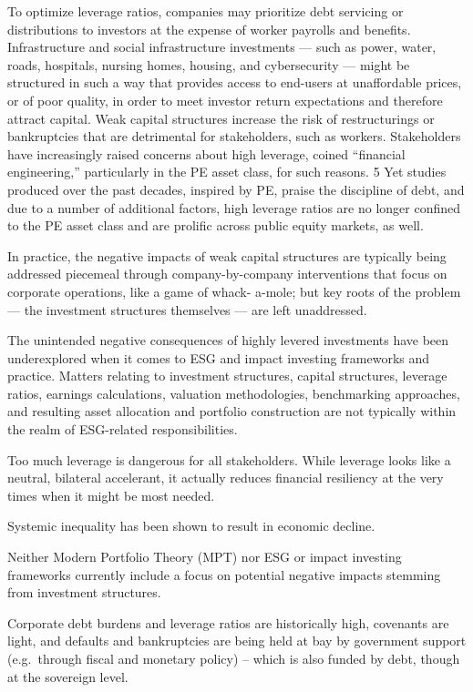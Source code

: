 \documentclass[
]{book}
\begin{document}
To optimize leverage ratios, companies may prioritize debt servicing or distributions to investors at the
expense of worker payrolls and benefits. Infrastructure and social infrastructure investments --- such as
power, water, roads, hospitals, nursing homes, housing, and cybersecurity --- might be structured in
such a way that provides access to end-users at unaffordable prices, or of poor quality, in order to meet
investor return expectations and therefore attract capital. Weak capital structures increase the risk of
restructurings or bankruptcies that are detrimental for stakeholders, such as workers. Stakeholders have
increasingly raised concerns about high leverage, coined ``financial engineering,'' particularly in the PE
asset class, for such reasons. 5 Yet studies produced over the past decades, inspired by PE, praise the
discipline of debt, and due to a number of additional factors, high leverage ratios are no longer confined
to the PE asset class and are prolific across public equity markets, as well.

In practice, the negative impacts of weak capital structures are typically being addressed piecemeal
through company-by-company interventions that focus on corporate operations, like a game of whack-
a-mole; but key roots of the problem --- the investment structures themselves --- are left unaddressed.

The unintended negative consequences of highly levered investments have been underexplored when it
comes to ESG and impact investing frameworks and practice. Matters relating to investment structures,
capital structures, leverage ratios, earnings calculations, valuation methodologies, benchmarking
approaches, and resulting asset allocation and portfolio construction are not typically within the realm
of ESG-related responsibilities.

Too much leverage is dangerous for all stakeholders.
While leverage looks like a neutral, bilateral accelerant, it
actually reduces financial resiliency at the very times when it might be most needed.

Systemic inequality has been shown to result in economic decline.

Neither Modern Portfolio Theory (MPT) nor ESG or impact investing frameworks
currently include a focus on potential negative impacts stemming from
investment structures.

Corporate debt burdens and leverage ratios are historically high, covenants are light, and
defaults and bankruptcies are being held at bay by government support
(e.g.~through fiscal and monetary policy) -- which is also funded by debt,
though at the sovereign level.
\end{document}
